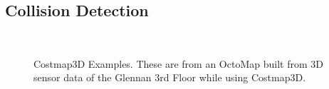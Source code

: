 \subsection{Collision Detection}\label{subsec:trajectory_generation_costmap3d}

\begin{figure}
\centering
{}
\\
\caption[Costmap3D Examples]{Costmap3D Examples. These are from an OctoMap built from 3D sensor data of the Glennan 3rd Floor while using Costmap3D.}
\label{fig:costmap3d_examples}
\end{figure}

